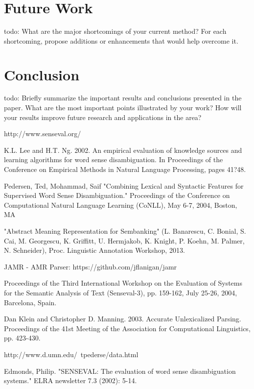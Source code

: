 \documentclass[12pt]{article}
\begin{document}
\section{Future Work}

todo: What are the major shortcomings of your current method? For each shortcoming, propose additions or enhancements that would help overcome it.

\section{Conclusion}

todo: Briefly summarize the important results and conclusions presented in the paper. What are the most important points illustrated by your work? How will your results improve future research and applications in the area? 

\begin{thebibliography}{9}

http://www.senseval.org/

K.L. Lee and H.T. Ng.  2002.  An empirical evaluation of knowledge sources and learning algorithms for word sense disambiguation.   In Proceedings of the Conference on Empirical Methods in Natural Language Processing, pages 41?48.

Pedersen, Ted, Mohammad, Saif  "Combining Lexical and Syntactic Features for Supervised Word Sense Disambiguation." Proceedings of the Conference on Computational Natural Language Learning (CoNLL), May 6-7, 2004, Boston, MA

"Abstract Meaning Representation for Sembanking" (L. Banarescu, C. Bonial, S. Cai, M. Georgescu, K. Griffitt, U. Hermjakob, K. Knight, P. Koehn, M. Palmer, N. Schneider), Proc. Linguistic Annotation Workshop, 2013. 

JAMR - AMR Parser: https://github.com/jflanigan/jamr

Proceedings of the Third International Workshop on the Evaluation of Systems for the Semantic Analysis of Text (Senseval-3), pp. 159-162, July 25-26, 2004, Barcelona, Spain. 

Dan Klein and Christopher D. Manning. 2003. Accurate Unlexicalized Parsing. Proceedings of the 41st Meeting of the Association for Computational Linguistics, pp. 423-430. 

http://www.d.umn.edu/~tpederse/data.html

Edmonds, Philip. "SENSEVAL: The evaluation of word sense disambiguation systems." ELRA newsletter 7.3 (2002): 5-14.

\end{thebibliography}
\end{document}
